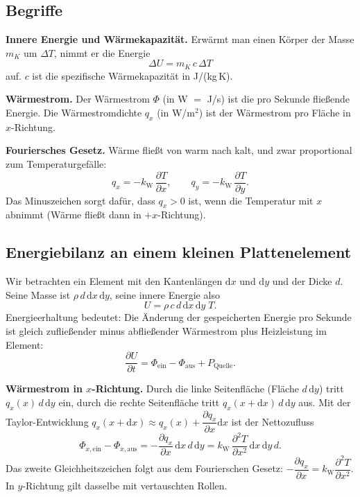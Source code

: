 \documentclass[11pt,a4paper]{article}
\numberwithin{equation}{section}
\newcommand{\dd}{\mathrm{d}}
\newcommand{\pd}[2]{\dfrac{\partial #1}{\partial #2}}
\newcommand{\pdd}[2]{\dfrac{\partial^{2} #1}{\partial #2^{2}}}
\newcommand{\kW}{k_{\mathrm W}}
\begin{document}
\subsection{Begriffe}

\textbf{Innere Energie und Wärmekapazität.} Erwärmt man einen Körper der Masse $m_K$ um $\Delta T$, nimmt er die Energie
\begin{equation}
 \Delta U = m_K\,c\,\Delta T
\end{equation}
auf. $c$ ist die spezifische Wärmekapazität in J/(kg\,K).

\textbf{Wärmestrom.} Der Wärmestrom $\Phi$ (in W $=$ J/s) ist die pro Sekunde fließende Energie. Die Wärmestromdichte $q_x$ (in W/m$^2$) ist der Wärmestrom pro Fläche in $x$-Richtung.

\textbf{Fouriersches Gesetz.} Wärme fließt von warm nach kalt, und zwar proportional zum Temperaturgefälle:
\begin{equation}
 q_x=-\kW\,\pd{T}{x},\qquad q_y=-\kW\,\pd{T}{y}.
\end{equation}
Das Minuszeichen sorgt dafür, dass $q_x>0$ ist, wenn die Temperatur mit $x$ abnimmt (Wärme fließt dann in $+x$-Richtung).

\subsection{Energiebilanz an einem kleinen Plattenelement}

Wir betrachten ein Element mit den Kantenlängen $\dd x$ und $\dd y$ und der Dicke $d$. Seine Masse ist $\rho\,d\,\dd x\,\dd y$, seine innere Energie also
\begin{equation}
 U = \rho\,c\,d\,\dd x\,\dd y\;T.
\end{equation}
Energieerhaltung bedeutet: Die Änderung der gespeicherten Energie pro Sekunde ist gleich zufließender minus abfließender Wärmestrom plus Heizleistung im Element:
\begin{equation}
 \pd{U}{t}=\Phi_\mathrm{ein}-\Phi_\mathrm{aus}+P_\mathrm{Quelle}.
\end{equation}

\textbf{Wärmestrom in $x$-Richtung.} Durch die linke Seitenfläche (Fläche $d\,\dd y$) tritt $q_x(x)\,d\,\dd y$ ein, durch die rechte Seitenfläche tritt $q_x(x+\dd x)\,d\,\dd y$ aus. Mit der Taylor-Entwicklung $q_x(x+\dd x)\approx q_x(x)+\pd{q_x}{x}\dd x$ ist der Nettozufluss
\begin{equation}
 \Phi_{x,\mathrm{ein}}-\Phi_{x,\mathrm{aus}}
 = -\pd{q_x}{x}\,\dd x\,d\,\dd y
 = \kW\,\pdd{T}{x}\,\dd x\,\dd y\,d .
\end{equation}
Das zweite Gleichheitszeichen folgt aus dem Fourierschen Gesetz: $-\pd{q_x}{x}=\kW\pdd{T}{x}$. In $y$-Richtung gilt dasselbe mit vertauschten Rollen.
\end{document}
